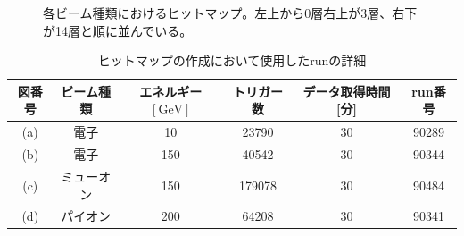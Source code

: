 \begin{figure}[H]
\begin{minipage}[b]{0.45\linewidth}
  \end{minipage}
  \caption{各ビーム種類におけるヒットマップ。左上から0層右上が3層、右下が14層と順に並んでいる。}
  \label{hitmap}
\end{figure}

\begin{table}[H]
\centering
\begin{tabular}{ c c c c c c}
\hline
図番号 & ビーム種類 & エネルギー$ [\mathrm{GeV}] $ & トリガー数 & データ取得時間 [分] & run番号 \\
\hline \hline
(a) & 電子 & 10 & 23790 & 30 & 90289 \\
(b) & 電子 & 150 & 40542 & 30 & 90344 \\
(c) & ミューオン & 150 & 179078 & 30 & 90484 \\
(d) & パイオン & 200 & 64208 & 30 & 90341 \\
\hline
\end{tabular}
\caption{ヒットマップの作成において使用したrunの詳細}
\end{table}

